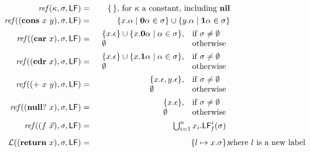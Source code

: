 \documentclass{sig-alternate}
\def\myvec{\mathaccent"017E } %
\begin{document}
\begin{figure*}[t]  
\begin{eqnarray*}
\mathit{ref\/}(\kappa,\sigma,\Lfonly)
          &=& \{\,\} \mbox{, for $\kappa$ a constant, including $\NIL$}\\
\mathit{ref\/}((\CONS~x~y),\sigma,\Lfonly)
          &=& \{x.\alpha \mid \acar\alpha \in \sigma\} \cup \{y.\alpha \mid \acdr\alpha \in \sigma\} \\
\mathit{ref\/}((\CAR~x),\sigma,\Lfonly)
          &=&    \begin{array}{l l}
                    \{x.\epsilon\} \cup \{x.\acar\alpha \mid \alpha \in
\sigma\}, & \mbox{if}~\sigma \ne \emptyset\\
                    \emptyset  & \mbox{otherwise}
                 \end{array} \\
\mathit{ref\/}((\CDR~x),\sigma,\Lfonly)
          &=&    \begin{array}{l l}
                    \{x.\epsilon\} \cup \{x.\acdr\alpha \mid \alpha \in
\sigma\}, & \mbox{if}~\sigma \ne \emptyset\\
                    \emptyset  & \mbox{otherwise}
                 \end{array} \\
\mathit{ref\/}((\PRIM~x~y),\sigma,\Lfonly)
          &=&    \begin{array}{l l}
                    \{x.\epsilon, y.\epsilon\},  & \mbox{if}~\sigma \ne \emptyset\\
                    \emptyset  & \mbox{otherwise}
                 \end{array} \\
\mathit{ref\/}((\NULLQ~x),\sigma,\Lfonly)
          &=&    \begin{array}{l l}
                    \{x.\epsilon\},  & \mbox{if}~\sigma \ne \emptyset\\
                    \emptyset  & \mbox{otherwise}
                 \end{array} \\
\mathit{ref\/}((f~\myvec{x}),\sigma,\Lfonly)
          &=&  \begin{array}{@{}l}  %
               \bigcup_{i=1}^n x_i.\Lf{f}{i}{\sigma}
               \end{array}
\\[1ex]
\mathcal{L}((\RETURN~x),\sigma,\Lfonly) &=& \{l \mapsto x.\sigma\}, \makebox[0mm]{\hspace*{3cm} where $l$ is a new label} \\

\end{eqnarray*}
\end{figure*}
\end{document}
